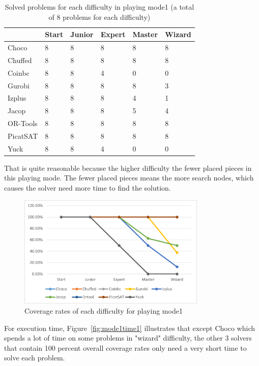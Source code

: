 \begin{table}[H]
\centering
\caption{Solved problems for each difficulty in playing mode1 (a total of 8 problems for each difficulty)}
\label{tab:solvedproblemforeach difficulty1}
\begin{tabular}{|l|l|l|l|l|l|}
\hline
	    &Start	&Junior	&Expert	&Master	&Wizard\\
\hline
Choco	&8	&8	&8	&8	&8\\
\hline
Chuffed	&8	&8	&8	&8	&8\\
\hline
Coinbc	&8	&8	&4	&0	&0\\
\hline
Gurobi	&8	&8	&8	&8	&3\\
\hline
Izplus	&8	&8	&8	&4	&1\\
\hline
Jacop	&8	&8	&8	&5	&4\\
\hline
OR-Tools	&8	&8	&8	&8	&8\\
\hline
PicatSAT	&8	&8	&8	&8	&8\\
\hline
Yuck	&8	&8	&4	&0	&0\\
\hline
\end{tabular}
\end{table}
That is quite reasonable because the higher difficulty the fewer placed pieces in this playing mode. The fewer placed pieces means the more search nodes, which causes the solver need more time to find the solution.
\begin{figure}[H]
    \centering
    \includegraphics[width=0.8\textwidth]{figs/mode1seperatedcoverage.png}
    \caption{Coverage rates of each difficulty for playing mode1}
    \label{fig:mode1eva4}
\end{figure}
For execution time, Figure~\ref{fig:mode1time1} illustrates that except Choco which spends a lot of time on some problems in  "wizard" difficulty, the other 3 solvers that contain 100 percent overall coverage rates only need a very short time to solve each problem. 
